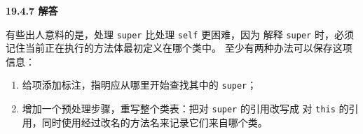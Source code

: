 \begin{taplauthorsolutionentrybox}
\label{sol:author:19.4.7}
\textbf{19.4.7 解答}

有些出人意料的是，处理 \texttt{super} 比处理 \texttt{self} 更困难，因为
解释 \texttt{super} 时，必须记住当前正在执行的方法体最初定义在哪个类中。
至少有两种办法可以保存这项信息：
\begin{enumerate}
\item 给项添加标注，指明应从哪里开始查找其中的 \texttt{super}；
\item 增加一个预处理步骤，重写整个类表：把对 \texttt{super} 的引用改写成
对 \texttt{this} 的引用，同时使用经过改名的方法名来记录它们来自哪个类。
\end{enumerate}

\end{taplauthorsolutionentrybox}

